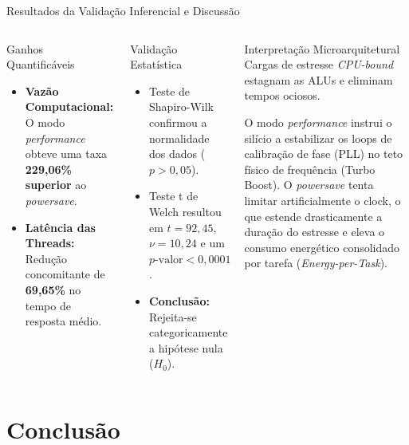 \documentclass[aspectratio=169,10pt]{beamer}
\begin{document}
\begin{frame}{Resultados da Validação Inferencial e Discussão}
    \begin{columns}[T]
        \begin{block}{Ganhos Quantificáveis}
            \begin{itemize}
                \item \textbf{Vazão Computacional:} O modo \textit{performance} obteve uma taxa \textbf{229,06\% superior} ao \textit{powersave}.
                \item \textbf{Latência das Threads:} Redução concomitante de \textbf{69,65\%} no tempo de resposta médio.
            \end{itemize}
        \end{block}

        \begin{alertblock}{Validação Estatística}
            \begin{itemize}
                \item Teste de Shapiro-Wilk confirmou a normalidade dos dados ($p > 0,05$).
                \item Teste t de Welch resultou em $t = 92,45$, $\nu = 10,24$ e um \textbf{$p\text{-valor} < 0,0001$}.
                \item \textbf{Conclusão:} Rejeita-se categoricamente a hipótese nula ($H_0$).
            \end{itemize}
        \end{alertblock}

        \begin{block}{Interpretação Microarquitetural}
            Cargas de estresse \textit{CPU-bound} estagnam as ALUs e eliminam tempos ociosos. 
            
            \vspace{0.2cm}
            O modo \textit{performance} instrui o silício a estabilizar os loops de calibração de fase (PLL) no teto físico de frequência (Turbo Boost). O \textit{powersave} tenta limitar artificialmente o clock, o que estende drasticamente a duração do estresse e eleva o consumo energético consolidado por tarefa (\textit{Energy-per-Task}).
        \end{block}
    \end{columns}
\end{frame}


\section{Conclusão}
\end{document}
